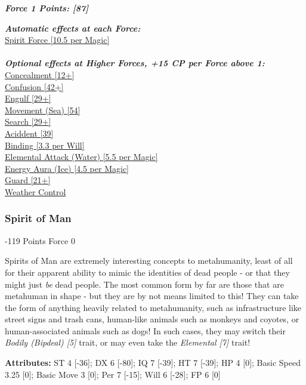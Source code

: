 \begin{multicols*}{3}
	\textbf{\textit{Force 1 Points: [87]}}
	
	\textbf{\textit{Automatic effects at each Force:\\}}
	\hyperref[spirit_force]{Spirit Force [10.5 per Magic]}\\\\
	
	\textbf{\textit{Optional effects at Higher Forces, +15 CP per Force above 1:\\}}
	\hyperref[concealment]{Concealment [12+]}\\
	\hyperref[confusion]{Confusion [42+]}\\
	\hyperref[engulf]{Engulf [29+]}\\
	\hyperref[movement]{Movement (Sea) [54]}\\
	\hyperref[search]{Search [29+]}\\
	\hyperref[accident]{Aciddent [39]}\\
	\hyperref[binding]{Binding [3.3 per Will]}\\
	\hyperref[elemental_attack]{Elemental Attack (Water) [5.5 per Magic]}\\
	\hyperref[energy_aura]{Energy Aura (Ice) [4.5 per Magic]}\\
	\hyperref[guard]{Guard [21+]}\\
	\hyperref[weather_control]{Weather Control}\\
	
	\subsubsection{Spirit of Man}
	\begin{flushright}
		-119 Points Force 0
	\end{flushright}
	
	Spirits of Man are extremely interesting concepts to metahumanity, least of all for their apparent ability to mimic the identities of dead people - or that they might just \textit{be} dead people. The most common form by far are those that are metahuman in shape - but they are by not means limited to this! They can take the form of anything heavily related to metahumanity, such as infrastructure like street signs and trash cans, human-like animals such as monkeys and coyotes, or human-associated animals such as dogs! In such cases, they may switch their \textit{Bodily (Bipdeal) [5]} trait, or may even take the \textit{Elemental [7]} trait!
	
	\textbf{Attributes:}
	ST 4 [-36]; DX 6 [-80]; IQ 7 [-39]; HT 7 [-39]; HP 4 [0]; Basic Speed 3.25 [0]; Basic Move 3 [0]; Per 7 [-15]; Will 6 [-28]; FP 6 [0]
	

\end{multicols*}
